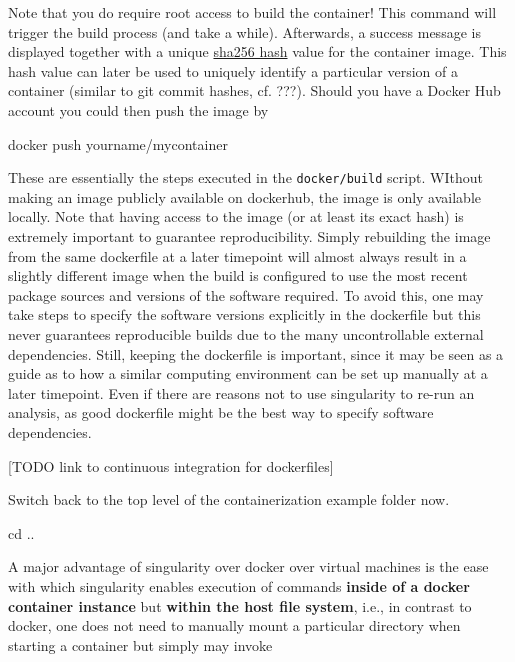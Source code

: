 \documentclass[]{book}
\newenvironment{Shaded}{\begin{snugshade}}{\end{snugshade}}
\newcommand{\BuiltInTok}[1]{#1}
\newcommand{\ExtensionTok}[1]{#1}
\newcommand{\NormalTok}[1]{#1}
\begin{document}
Note that you do require root access to build the container! This
command will trigger the build process (and take a while). Afterwards, a
success message is displayed together with a unique
\href{https://en.wikipedia.org/wiki/SHA-2}{sha256 hash} value for the
container image. This hash value can later be used to uniquely identify
a particular version of a container (similar to git commit hashes, cf.
???). Should you have a Docker Hub account you could then push the image
by

\begin{Shaded}
\begin{Highlighting}[]
\ExtensionTok{docker}\NormalTok{ push yourname/mycontainer}
\end{Highlighting}
\end{Shaded}

These are essentially the steps executed in the \texttt{docker/build}
script. WIthout making an image publicly available on dockerhub, the
image is only available locally. Note that having access to the image
(or at least its exact hash) is extremely important to guarantee
reproducibility. Simply rebuilding the image from the same dockerfile at
a later timepoint will almost always result in a slightly different
image when the build is configured to use the most recent package
sources and versions of the software required. To avoid this, one may
take steps to specify the software versions explicitly in the dockerfile
but this never guarantees reproducible builds due to the many
uncontrollable external dependencies. Still, keeping the dockerfile is
important, since it may be seen as a guide as to how a similar computing
environment can be set up manually at a later timepoint. Even if there
are reasons not to use singularity to re-run an analysis, as good
dockerfile might be the best way to specify software dependencies.

{[}TODO link to continuous integration for dockerfiles{]}

Switch back to the top level of the containerization example folder now.

\begin{Shaded}
\begin{Highlighting}[]
\BuiltInTok{cd}\NormalTok{ ..}
\end{Highlighting}
\end{Shaded}

A major advantage of singularity over docker over virtual machines is
the ease with which singularity enables execution of commands
\textbf{inside of a docker container instance} but \textbf{within the
host file system}, i.e., in contrast to docker, one does not need to
manually mount a particular directory when starting a container but
simply may invoke
\end{document}
